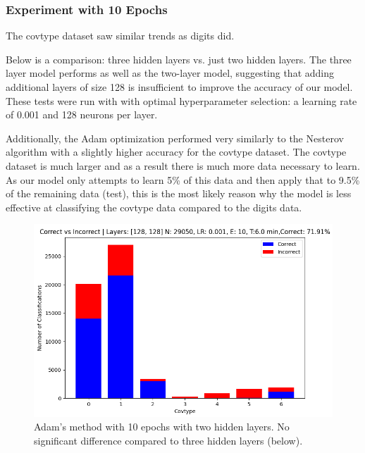 \documentclass{article}
\begin{document}
\subsubsection{Experiment with 10 Epochs}
The covtype dataset saw similar trends as digits did. 

Below is a comparison: three hidden layers vs. just two hidden layers. The three layer model performs as well as the two-layer model, suggesting that adding additional layers of size 128 is insufficient to improve the accuracy of our model. These tests were run with with optimal hyperparameter selection: a learning rate of 0.001 and 128 neurons per layer.

Additionally, the Adam optimization performed very similarly to the Nesterov algorithm with a slightly higher accuracy for the covtype dataset. The covtype dataset is much larger and as a result there is much more data necessary to learn. As our model only attempts to learn 5\% of this data and then apply that to 9.5\% of the remaining data (test), this is the most likely reason why the model is less effective at classifying the covtype data compared to the digits data. 

\begin{figure}
    \centering
    \includegraphics[scale=0.5]{image.png}
    \caption{Adam's method with 10 epochs with two hidden layers. No significant difference compared to three hidden layers (below).}
    \label{fig:enter-label}
\end{figure}
\end{document}
